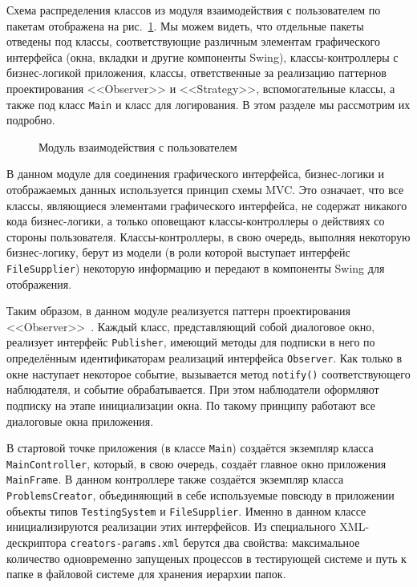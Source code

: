 Схема распределения классов из модуля взаимодействия с пользователем по пакетам отображена на рис.~\ref{package_diagram_interaction}. Мы можем видеть, что отдельные пакеты отведены под классы, соответствующие различным элементам графического интерфейса (окна, вкладки и другие компоненты Swing), классы-контроллеры с бизнес-логикой приложения, классы, ответственные за реализацию паттернов проектирования <<Observer>> и <<Strategy>>, вспомогательные классы, а также под класс \texttt{Main} и класс для логирования. В этом разделе мы рассмотрим их подробно.

\begin{figure}[h]
\caption{Модуль взаимодействия с пользователем}
\label{package_diagram_interaction}
\end{figure}

В данном модуле для соединения графического интерфейса, бизнес-логики и отображаемых данных используется принцип схемы MVC. Это означает, что все классы, являющиеся элементами графического интерфейса, не содержат никакого кода бизнес-логики, а только оповещают классы-контроллеры о действиях со стороны пользователя. Классы-контроллеры, в свою очередь, выполняя некоторую бизнес-логику, берут из модели (в роли которой выступает интерфейс \texttt{File\-Supplier}) некоторую информацию и передают в компоненты Swing для отображения.

Таким образом, в данном модуле реализуется паттерн проектирования <<Ob\-ser\-ver>>~\cite{gamma}. Каждый класс, представляющий собой диалоговое окно, реализует интерфейс \texttt{Publisher}, имеющий методы для подписки в него по определённым идентификаторам реализаций интерфейса \texttt{Observer}. Как только в окне наступает некоторое событие, вызывается метод \texttt{notify()} соответствующего наблюдателя, и событие обрабатывается. При этом наблюдатели оформляют подписку на этапе инициализации окна. По такому принципу работают все диалоговые окна приложения.

В стартовой точке приложения (в классе \texttt{Main}) создаётся экземпляр класса \texttt{Main\-Controller}, который, в свою очередь, создаёт главное окно приложения \texttt{Main\-Frame}. В данном контроллере также создаётся экземпляр класса \texttt{Problems\-Creator}, объединяющий в себе используемые повсюду в приложении объекты типов \texttt{Testing\-System} и \texttt{File\-Supplier}. Именно в данном классе инициализируются реализации этих интерфейсов. Из специального XML-дескриптора \texttt{creators-pa\-rams.xml} берутся два свойства: максимальное количество одновременно запущеных процессов в тестирующей системе и путь к папке в файловой системе для хранения иерархии папок.

